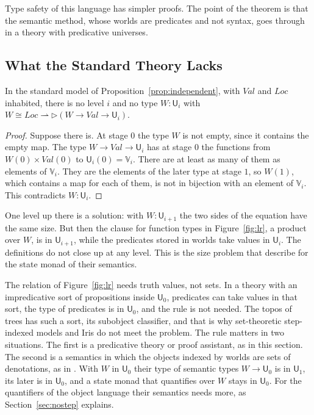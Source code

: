 \documentclass[acmsmall,nonacm,screen]{acmart}
\newcommand{\later}{{\triangleright}}
\newcommand{\Uv}{\mathsf{U}}
\newcommand{\Vg}{\mathbb{V}}
\newcommand{\Loc}{\mathit{Loc}}
\newcommand{\Val}{\mathit{Val}}
\newcommand{\Wld}{W}
\newcommand{\fmap}{\rightharpoonup}
\begin{document}
Type safety of this language has simpler proofs. The point of the theorem is that the
semantic method, whose worlds are predicates and not syntax, goes through in a theory with
predicative universes.

\subsection{What the Standard Theory Lacks}

\begin{proposition}\label{prop:noworlds}
In the standard model of Proposition~\ref{prop:independent}, with $\Val$ and $\Loc$
inhabited, there is no level $i$ and no type $\Wld : \Uv_i$ with
$\Wld \cong \Loc \fmap \later(\Wld \to \Val \to \Uv_i)$.
\end{proposition}

\begin{proof}
Suppose there is. At stage $0$ the type $\Wld$ is not empty, since it contains the empty
map. The type $\Wld \to \Val \to \Uv_i$ has at stage $0$ the functions from
$\Wld(0) \times \Val(0)$ to $\Uv_i(0) = \Vg_i$. There are at least as many of them as elements of
$\Vg_i$. They are the elements of the later type at stage $1$, so $\Wld(1)$, which contains
a map for each of them, is not in bijection with an element of $\Vg_i$. This contradicts
$\Wld : \Uv_i$.
\end{proof}

One level up there is a solution: with $\Wld : \Uv_{i+1}$ the two sides of the equation have
the same size. But then the clause for function types in Figure~\ref{fig:lr}, a product
over $\Wld$, is in $\Uv_{i+1}$, while the predicates stored in worlds take values in
$\Uv_i$. The definitions do not close up at any level. This is the size problem that
\citet{SGB2022} describe for the state monad of their semantics.

\begin{remark}\label{rem:prop}
The relation of Figure~\ref{fig:lr} needs truth values, not sets. In a theory with an
impredicative sort of propositions inside $\Uv_0$, predicates can take values in that sort,
the type of predicates is in $\Uv_0$, and the rule is not needed. The topos of trees has
such a sort, its subobject classifier, and that is why set-theoretic step-indexed models
and Iris do not meet the problem. The rule matters in two situations. The first is a
predicative theory or proof assistant, as in this section. The second is a semantics in
which the objects indexed by worlds are sets of denotations, as in \citet{SGB2022}. With
$\Wld$ in $\Uv_0$ their type of semantic types $\Wld \to \Uv_0$ is in $\Uv_1$, its later is
in $\Uv_0$, and a state monad that quantifies over $\Wld$ stays in $\Uv_0$. For the
quantifiers of the object language their semantics needs more, as
Section~\ref{sec:nostep} explains.
\end{remark}
\end{document}
